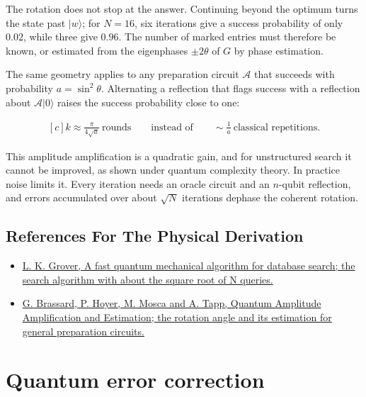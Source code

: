\documentclass[11pt,oneside]{book}
\newenvironment{centeredalign}{\[\begin{gathered}[c]}{\end{gathered}\]}
\begin{document}
The rotation does not stop at the answer. Continuing beyond the optimum turns the state past \(|w\rangle\); for \(N=16\), six iterations give a success probability of only \(0.02\), while three give \(0.96\). The number of marked entries must therefore be known, or estimated from the eigenphases \(\pm2\theta\) of \(G\) by phase estimation.

The same geometry applies to any preparation circuit \(\mathcal A\) that succeeds with probability \(a=\sin^2\theta\). Alternating a reflection that flags success with a reflection about \(\mathcal A|0\rangle\) raises the success probability close to one:

\begin{centeredalign}
k\approx\frac{\pi}{4\sqrt a}\ \text{rounds}\qquad\text{instead of}\qquad\sim\frac1a\ \text{classical repetitions}.
\end{centeredalign}

This amplitude amplification is a quadratic gain, and for unstructured search it cannot be improved, as shown under quantum complexity theory. In practice noise limits it. Every iteration needs an oracle circuit and an \(n\)-qubit reflection, and errors accumulated over about \(\sqrt N\) iterations dephase the coherent rotation.

\subsection*{References For The Physical Derivation}
\begin{itemize}
\item \href{https://arxiv.org/abs/quant-ph/9605043}{L. K. Grover, A fast quantum mechanical algorithm for database search; the search algorithm with about the square root of N queries.}
\item \href{https://arxiv.org/abs/quant-ph/0005055}{G. Brassard, P. Hoyer, M. Mosca and A. Tapp, Quantum Amplitude Amplification and Estimation; the rotation angle and its estimation for general preparation circuits.}
\end{itemize}





\clearpage

\section{Quantum error correction}

\label{topic:quantum-error-correction}
\end{document}
